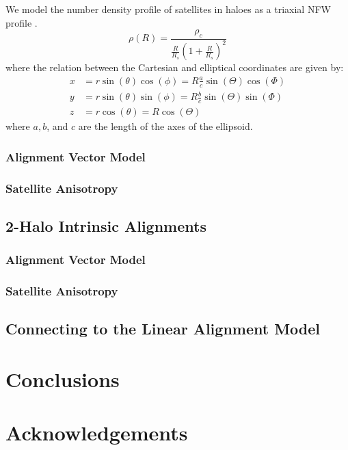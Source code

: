 \documentclass[fleqn,usenatbib]{mnras}
\begin{document}
We model the number density profile of satellites in haloes as a triaxial NFW profile \citep{Jing:2002bs}.
%
\begin{equation}
\rho(R) = \frac{\rho_c}{\frac{R}{R_s}\left( 1+\frac{R}{R_s} \right)^2}
\end{equation}
%
where the relation between the Cartesian and elliptical coordinates are given by:
%
\begin{align}
x &= r\sin(\theta)\cos(\phi) = R\frac{a}{c}\sin(\Theta)\cos(\Phi) \nonumber \\
y &= r\sin(\theta)\sin(\phi) = R\frac{b}{c}\sin(\Theta)\sin(\Phi) \nonumber \\
z &= r\cos(\theta) = R \cos(\Theta)
\end{align}
%
where $a,b$, and $c$ are the length of the axes of the ellipsoid.

\subsubsection{Alignment Vector Model}

\subsubsection{Satellite Anisotropy}

\subsection{2-Halo Intrinsic Alignments}

\subsubsection{Alignment Vector Model}

\subsubsection{Satellite Anisotropy}

\subsection{Connecting to the Linear Alignment Model}

\section{Conclusions}

\section*{Acknowledgements}










\bsp	%
\label{lastpage}
\end{document}
